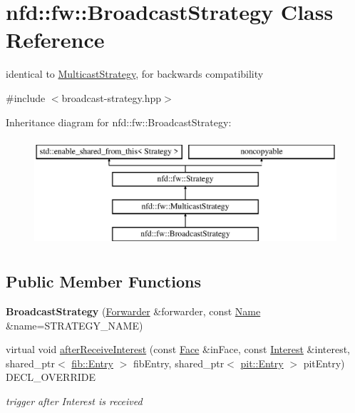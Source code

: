 \hypertarget{classnfd_1_1fw_1_1BroadcastStrategy}{}\section{nfd\+:\+:fw\+:\+:Broadcast\+Strategy Class Reference}
\label{classnfd_1_1fw_1_1BroadcastStrategy}


identical to \hyperlink{classnfd_1_1fw_1_1MulticastStrategy}{Multicast\+Strategy}, for backwards compatibility  




{\ttfamily \#include $<$broadcast-\/strategy.\+hpp$>$}

Inheritance diagram for nfd\+:\+:fw\+:\+:Broadcast\+Strategy\+:\begin{figure}[H]
\begin{center}
\leavevmode
\includegraphics[height=4.000000cm]{classnfd_1_1fw_1_1BroadcastStrategy}
\end{center}
\end{figure}
\subsection*{Public Member Functions}
\begin{DoxyCompactItemize}
\item 
{\bfseries Broadcast\+Strategy} (\hyperlink{classnfd_1_1Forwarder}{Forwarder} \&forwarder, const \hyperlink{classndn_1_1Name}{Name} \&name=S\+T\+R\+A\+T\+E\+G\+Y\+\_\+\+N\+A\+ME)\hypertarget{classnfd_1_1fw_1_1BroadcastStrategy_a218a7d55425af24c94199b4bd6ce7a7c}{}\label{classnfd_1_1fw_1_1BroadcastStrategy_a218a7d55425af24c94199b4bd6ce7a7c}

\item 
virtual void \hyperlink{classnfd_1_1fw_1_1BroadcastStrategy_a08823b7058a224203f7ddc3c32203e50}{after\+Receive\+Interest} (const \hyperlink{classnfd_1_1Face}{Face} \&in\+Face, const \hyperlink{classndn_1_1Interest}{Interest} \&interest, shared\+\_\+ptr$<$ \hyperlink{classnfd_1_1fib_1_1Entry}{fib\+::\+Entry} $>$ fib\+Entry, shared\+\_\+ptr$<$ \hyperlink{classnfd_1_1pit_1_1Entry}{pit\+::\+Entry} $>$ pit\+Entry) D\+E\+C\+L\+\_\+\+O\+V\+E\+R\+R\+I\+DE
\begin{DoxyCompactList}\small\item\em trigger after Interest is received \end{DoxyCompactList}\end{DoxyCompactItemize}
